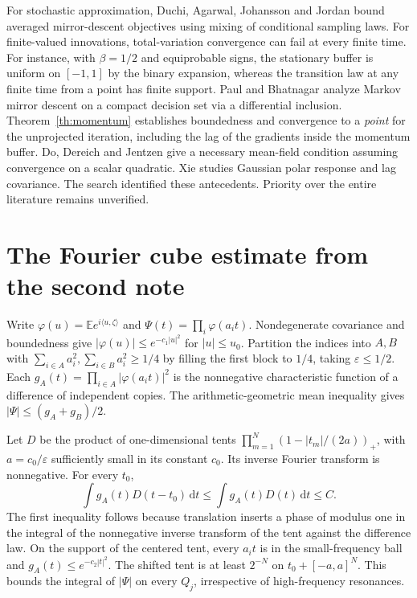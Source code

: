 \documentclass[10pt,letterpaper]{article}
\newcommand{\E}{\mathbb E}
\newcommand{\ip}[2]{\langle #1,#2\rangle}
\newcommand{\eps}{\varepsilon}
\newcommand{\dd}{\,\mathrm d}
\begin{document}
For stochastic approximation, Duchi, Agarwal, Johansson and Jordan \cite[Theorems 1--2]{duchi} bound averaged mirror-descent objectives using mixing of conditional sampling laws. For finite-valued innovations, total-variation convergence can fail at every finite time. For instance, with $\beta=1/2$ and equiprobable signs, the stationary buffer is uniform on $[-1,1]$ by the binary expansion, whereas the transition law at any finite time from a point has finite support. Paul and Bhatnagar \cite[Sections 2--3]{paul} analyze Markov mirror descent on a compact decision set via a differential inclusion. Theorem~\ref{th:momentum} establishes boundedness and convergence to a \emph{point} for the unprojected iteration, including the lag of the gradients inside the momentum buffer. Do, Dereich and Jentzen \cite[Proposition 6.2]{ddj} give a necessary mean-field condition assuming convergence on a scalar quadratic. Xie \cite[Appendices A--B]{xie} studies Gaussian polar response and lag covariance. The search identified these antecedents. Priority over the entire literature remains unverified.

\appendix
\section{The Fourier cube estimate from the second note}
Write $\varphi(u)=\E e^{i\ip u\zeta}$ and $\Psi(t)=\prod_i\varphi(a_it)$. Nondegenerate covariance and boundedness give $|\varphi(u)|\le e^{-c_1|u|^2}$ for $|u|\le u_0$. Partition the indices into $A,B$ with $\sum_{i\in A}a_i^2,\sum_{i\in B}a_i^2\ge1/4$ by filling the first block to $1/4$, taking $\eps\le1/2$. Each $g_A(t)=\prod_{i\in A}|\varphi(a_it)|^2$ is the nonnegative characteristic function of a difference of independent copies. The arithmetic-geometric mean inequality gives $|\Psi|\le(g_A+g_B)/2$.

Let $D$ be the product of one-dimensional tents $\prod_{m=1}^N(1-|t_m|/(2a))_+$, with $a=c_0/\eps$ sufficiently small in its constant $c_0$. Its inverse Fourier transform is nonnegative. For every $t_0$,
\[
 \int g_A(t)D(t-t_0)\dd t\le \int g_A(t)D(t)\dd t \le C.
\]
The first inequality follows because translation inserts a phase of modulus one in the integral of the nonnegative inverse transform of the tent against the difference law. On the support of the centered tent, every $a_it$ is in the small-frequency ball and $g_A(t)\le e^{-c_2|t|^2}$. The shifted tent is at least $2^{-N}$ on $t_0+[-a,a]^N$. This bounds the integral of $|\Psi|$ on every $Q_j$, irrespective of high-frequency resonances.
\end{document}
